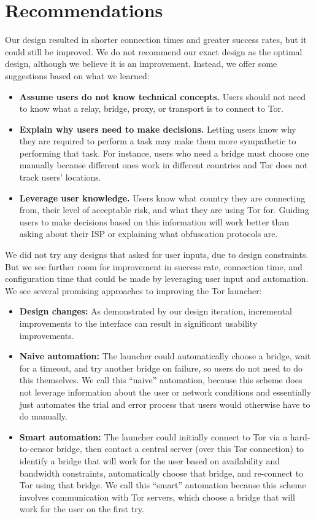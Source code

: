 \documentclass[USenglish,oneside,twocolumn]{article}
\begin{document}
\section{Recommendations}
\label{sec:recommendations}
Our design resulted in shorter connection times and greater success rates,  but it could still be improved. We do not recommend our exact design as the optimal design, although we believe it is an improvement. Instead, we offer some suggestions based on what we learned: \\
 
\begin{itemize}
\item {\bfseries Assume users do not know technical concepts.} Users should not need to know what a relay, bridge, proxy, or transport is to connect to Tor. 
\item {\bfseries Explain why users need to make decisions.} Letting users know why they are required to perform a task may make them more sympathetic to  performing that task. For instance, users who need a bridge must choose one manually because different ones work in different countries and Tor does not track users' locations.  
\item {\bfseries Leverage user knowledge.} Users know what country they are connecting from, their level of acceptable risk, and what they are using Tor for. Guiding users to make decisions based on this information will work better than asking about their ISP or explaining what obfuscation protocols are. 
\end{itemize}

We did not try any designs that asked for user inputs, due to design constraints. But we see further room for improvement in success rate, connection time, and configuration time that could be made by leveraging user input and automation. We see several promising approaches to improving the Tor launcher:  \\

\begin{itemize}
\item{\bfseries Design changes:} As demonstrated by our design iteration, incremental improvements to the interface can result in significant usability improvements.
\item{\bfseries Naive automation:} The launcher could automatically choose a bridge, wait for a timeout, and try another bridge on failure, so users do not need to do this themselves. We call this ``naive'' automation, because this scheme does not leverage information about the user or network conditions and essentially just automates the trial and error process that users would otherwise have to do manually.
\item{\bfseries Smart automation:} The launcher could initially connect to Tor via a hard-to-censor bridge, then contact a central server (over this Tor connection) to identify a bridge that will work for the user based on availability and bandwidth constraints, automatically choose that bridge, and re-connect to Tor using that bridge. We call this ``smart'' automation because this scheme involves communication with Tor servers, which choose a bridge that will work for the user on the first try. 
\end{itemize}
\end{document}
